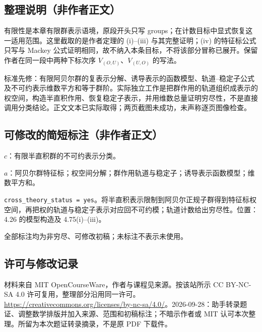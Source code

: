 \documentclass[UTF8,11pt]{ctexart}
\theoremstyle{definition}
\begin{document}
\subsection*{整理说明（非作者正文）}
有限性是本章有限群表示语境，原段开头只写 groups；在计数目标中显式恢复这一适用范围。这里截取的是作者定理的 (i)--(iii) 与其完整证明；(iv) 的特征标公式只写与 Mackey 公式证明相同，故不纳入本条目标，不将该部分冒称已展开。保留作者在同一段中两种下标次序 $V_{(O,U)}$、$V_{(U,O)}$ 的写法。

标准先修：有限阿贝尔群的复表示分解、诱导表示的函数模型、轨道--稳定子公式及不可约表示维数平方和等于群阶。实际独立工作是把群作用的轨道组织成表示的权空间，构造半直积作用、恢复稳定子表示，并用维数总量证明穷尽性，不是直接调用分类结论。正文文本已实际取得；两页截图未成功，未声称逐页图像检查。
\subsection*{可修改的简短标注（非作者正文）}
$c$：有限半直积群的不可约表示分类。

$a$：阿贝尔群特征标；权空间分解；群作用轨道与稳定子；诱导表示函数模型；维数平方和。

\texttt{cross\_theory\_status = yes}。将半直积表示限制到阿贝尔正规子群得到特征标权空间，再把权的轨道与稳定子表示对应回不可约模；轨道计数给出穷尽性。位置：4.26 的模型构造及 4.75(i)--(iii)。

全部标注均为非穷尽、可修改初稿；未标注不表示未使用。
\subsection*{许可与修改记录}
材料来自 MIT OpenCourseWare，作者与课程见来源。按该站所示 CC BY-NC-SA 4.0 许可复用，整理部分沿用同一许可。\url{https://creativecommons.org/licenses/by-nc-sa/4.0/}。2026-09-28：助手转录题证、调整数学排版并加入来源、范围和初稿标注；不暗示作者或 MIT 认可本次整理。所留为本次题证转录摘录，不是原 PDF 下载件。
\end{document}
